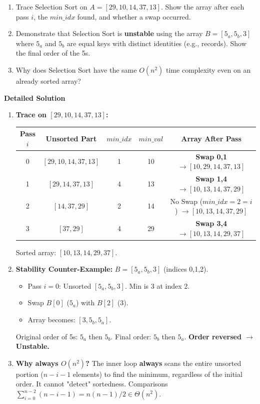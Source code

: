 \documentclass[11pt]{article}
\begin{document}
\begin{exoresolu}
    \begin{enumerate}
        \item Trace Selection Sort on $A = [29, 10, 14, 37, 13]$. Show the array after each pass $i$, the $min\_idx$ found, and whether a swap occurred.
        \item Demonstrate that Selection Sort is \textbf{unstable} using the array $B = [5_a, 5_b, 3]$ where $5_a$ and $5_b$ are equal keys with distinct identities (e.g., records). Show the final order of the 5s.
        \item Why does Selection Sort have the same $O(n^2)$ time complexity even on an already sorted array?
    \end{enumerate}
    \tcblower
    \textbf{Detailed Solution}
    \begin{enumerate}
        \item \textbf{Trace on $[29, 10, 14, 37, 13]$:}
            \begin{center}
            \begin{tabular}{|c|c|c|c|c|}\hline
            \rowcolor{popblueL}
            Pass $i$ & Unsorted Part & $min\_idx$ & $min\_val$ & Array After Pass \\ \hline
            0 & $[29, 10, 14, 37, 13]$ & 1 & 10 & \textbf{Swap 0,1} $\rightarrow [10, 29, 14, 37, 13]$ \\ \hline
            1 & $[29, 14, 37, 13]$ & 4 & 13 & \textbf{Swap 1,4} $\rightarrow [10, 13, 14, 37, 29]$ \\ \hline
            2 & $[14, 37, 29]$ & 2 & 14 & No Swap ($min\_idx=2=i$) $\rightarrow [10, 13, 14, 37, 29]$ \\ \hline
            3 & $[37, 29]$ & 4 & 29 & \textbf{Swap 3,4} $\rightarrow [10, 13, 14, 29, 37]$ \\ \hline
            \end{tabular}
            \end{center}
            Sorted array: $[10, 13, 14, 29, 37]$.
        \item \textbf{Stability Counter-Example:} $B = [5_a, 5_b, 3]$ (indices 0,1,2).
            \begin{itemize}
                \item Pass $i=0$: Unsorted $[5_a, 5_b, 3]$. Min is $3$ at index 2.
                \item Swap $B[0]$ ($5_a$) with $B[2]$ ($3$).
                \item Array becomes: $[3, 5_b, 5_a]$.
            \end{itemize}
            Original order of 5s: $5_a$ then $5_b$. Final order: $5_b$ then $5_a$. \textbf{Order reversed $\rightarrow$ Unstable.}
        \item \textbf{Why always $O(n^2)$?} The inner loop \textbf{always} scans the entire unsorted portion ($n-i-1$ elements) to find the minimum, regardless of the initial order. It cannot "detect" sortedness. Comparisons $\sum_{i=0}^{n-2} (n-i-1) = n(n-1)/2 \in \Theta(n^2)$.
    \end{enumerate}
\end{exoresolu}
\end{document}
